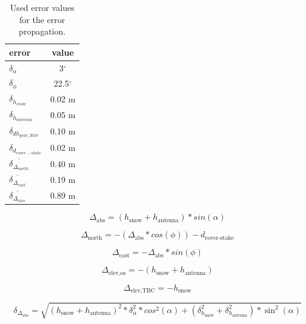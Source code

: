 \begin{table}[h]
	\caption{Used error values for the error propagation.}
	\centering
	\begin{tabular}{lc}
	\toprule
        error &  value \\
	\midrule
    $ \delta_{\alpha} $ &  3$^{\circ}$ \\
    $ \delta_{\phi} $ &  22.5$^{\circ}$ \\
    $ \delta_{h_{snow}}$ &  0.02 m \\
    $ \delta_{h_{antenna}} $ &  0.05 m \\
    $ \delta_{dh_{year,2018}} $ &  0.10 m \\
    $ \delta_{d_{rover-stake}} $ &  0.02 m \\
    $ \overline{\delta_{\Delta_{north}}} $ & 0.40 m \\
    $ \overline{\delta_{\Delta_{east}}} $ & 0.19 m \\
    $ \overline{\delta_{\Delta_{elev}}} $ & 0.89 m \\
    \bottomrule
\end{tabular}
	\label{GPS:tab:errors}
\end{table} 


\begin{equation}
	\Delta_{\text{abs}} = (h_{\text{snow}} + h_{\text{antenna}}) * sin(\alpha)
\end{equation}

\begin{equation}
	\Delta_{\text{north}} = - (\Delta_{\text{abs}} * cos(\phi)) - d_{\text{rover-stake}}
\end{equation}

\begin{equation}
	\Delta_{\text{east}} = - \Delta_{\text{abs}} * sin(\phi)
\end{equation}

\begin{equation}
	\Delta_{\text{elev,os}} = - (h_{\text{snow}} + h_{\text{antenna}}) 
\end{equation}

\begin{equation}
	\Delta_{\text{elev,TBC}} = - h_{\text{snow}} 
\end{equation}


\begin{equation}
	\delta_{\Delta_{\text{abs}}} = \sqrt{(h_{\text{snow}} + h_{\text{antenna}})^2 * \delta_{\alpha}^2 * cos^2(\alpha) + (\delta_{h_{\text{snow}}}^2 + \delta_{h_{\text{antenna}}}^2) * \sin^2(\alpha)}
\end{equation}

